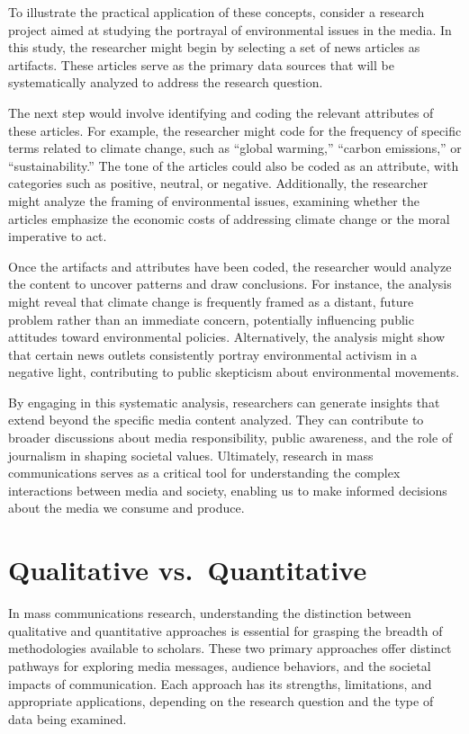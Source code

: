 \documentclass[
]{book}
\begin{document}
To illustrate the practical application of these concepts, consider a research project aimed at studying the portrayal of environmental issues in the media. In this study, the researcher might begin by selecting a set of news articles as artifacts. These articles serve as the primary data sources that will be systematically analyzed to address the research question.

The next step would involve identifying and coding the relevant attributes of these articles. For example, the researcher might code for the frequency of specific terms related to climate change, such as ``global warming,'' ``carbon emissions,'' or ``sustainability.'' The tone of the articles could also be coded as an attribute, with categories such as positive, neutral, or negative. Additionally, the researcher might analyze the framing of environmental issues, examining whether the articles emphasize the economic costs of addressing climate change or the moral imperative to act.

Once the artifacts and attributes have been coded, the researcher would analyze the content to uncover patterns and draw conclusions. For instance, the analysis might reveal that climate change is frequently framed as a distant, future problem rather than an immediate concern, potentially influencing public attitudes toward environmental policies. Alternatively, the analysis might show that certain news outlets consistently portray environmental activism in a negative light, contributing to public skepticism about environmental movements.

By engaging in this systematic analysis, researchers can generate insights that extend beyond the specific media content analyzed. They can contribute to broader discussions about media responsibility, public awareness, and the role of journalism in shaping societal values. Ultimately, research in mass communications serves as a critical tool for understanding the complex interactions between media and society, enabling us to make informed decisions about the media we consume and produce.

\section{Qualitative vs.~Quantitative}\label{qualitative-vs.-quantitative}

In mass communications research, understanding the distinction between qualitative and quantitative approaches is essential for grasping the breadth of methodologies available to scholars. These two primary approaches offer distinct pathways for exploring media messages, audience behaviors, and the societal impacts of communication. Each approach has its strengths, limitations, and appropriate applications, depending on the research question and the type of data being examined.
\end{document}
